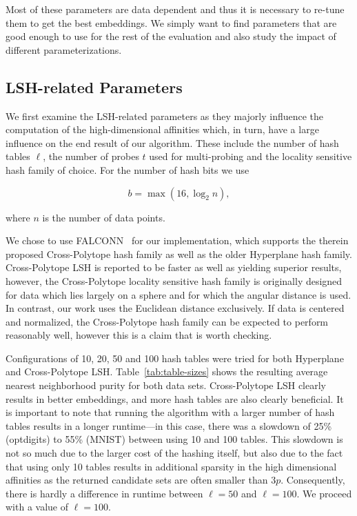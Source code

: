 Most of these parameters are data dependent and thus it is necessary to re-tune
them to get the best embeddings. We simply want to find parameters that are
good enough to use for the rest of the evaluation and also study the impact of
different parameterizations.

\subsection{LSH-related Parameters}

We first examine the LSH-related parameters as they majorly influence the computation
of the high-dimensional affinities which, in turn, have a large influence on the end
result of our algorithm. These include the number of hash tables $\ell$, the number of probes $t$
used for multi-probing and the locality sensitive hash family of choice. For the number
of hash bits we use

\begin{equation*}
  b = \max( 16, \log_2 n ),
\end{equation*}

where $n$ is the number of data points.

We chose to use FALCONN~\cite{falconn} for our implementation, which supports
the therein proposed Cross-Polytope hash family as well as the older Hyperplane
hash family. Cross-Polytope LSH is reported to be faster as well as yielding
superior results, however, the Cross-Polytope locality sensitive hash family is
originally designed for data which lies largely on a sphere and for which the
angular distance is used. In contrast, our work uses the Euclidean distance
exclusively. If data is centered and normalized, the Cross-Polytope hash family
can be expected to perform reasonably well, however this is a claim that is
worth checking.

Configurations of 10, 20, 50 and 100 hash tables were tried for both Hyperplane and
Cross-Polytope LSH. Table~\ref{tab:table-sizes} shows the resulting average
nearest neighborhood purity for both data sets. Cross-Polytope LSH clearly
results in better embeddings, and more hash tables are also clearly beneficial.
It is important to note that running the algorithm with a larger number of hash
tables results in a longer runtime---in this case, there was a slowdown of 25\%
(optdigits) to 55\% (MNIST) between using 10 and 100 tables. This slowdown is
not so much due to the larger cost of the hashing itself, but also due to the
fact that using only 10 tables results in additional sparsity in the high
dimensional affinities as the returned candidate sets are often smaller than
$3p$. Consequently, there is hardly a difference in runtime between $\ell = 50$
and $\ell = 100$. We proceed with a value of $\ell = 100$.

